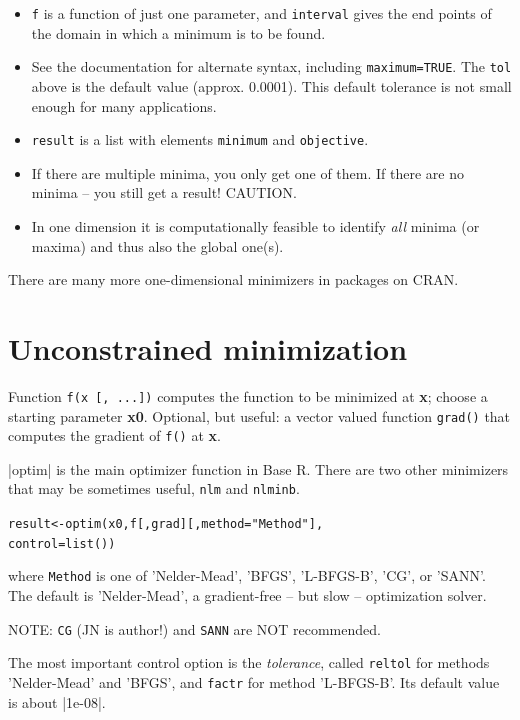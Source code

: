 \documentclass[9pt,a4paper,onecolumn,oneside]{extarticle}
\begin{document}
\begin{landscape}
\begin{multicols}{2}
\begin{itemize}
\item
  \texttt{f} is a function of just one parameter, and \texttt{interval}
  gives the end points of the domain in which a minimum is to be found.
\item
  See the documentation for alternate syntax, including \texttt{maximum=TRUE}.
  The \texttt{tol} above is the default value (approx. 0.0001). This default
  tolerance is not small enough for many applications.
\item
  \texttt{result} is a list with elements \texttt{minimum} and
  \texttt{objective}.
\item
  If there are multiple minima, you only get one of them.
  If there are no minima -- you still get a result! CAUTION.
\item
  In one dimension it is computationally feasible to identify
  \textit{all} minima (or maxima) and thus also the global one(s).
\end{itemize}

There are many more one-dimensional minimizers in packages on CRAN.


\section*{\color{darkred} Unconstrained minimization}

Function \texttt{f(x [, ...])} computes the function to be minimized at 
\textbf{x}; choose a starting parameter \textbf{x0}. Optional, but
useful: a vector valued function \texttt{grad()} that computes the gradient
of \texttt{f()} at \textbf{x}.

|optim| is the main optimizer function in Base R. There are two other
minimizers that may be sometimes useful, \verb|nlm| and \verb|nlminb|.

\begin{alltt}
 result <- optim(x0, f [, grad] [, method = "Method"],
                 control = list())
\end{alltt}
where \texttt{Method} is one of 'Nelder-Mead', 'BFGS', 'L-BFGS-B', 'CG', or 'SANN'.
The default is 'Nelder-Mead', a gradient-free -- but slow -- optimization solver.

NOTE: \texttt{CG} (JN is author!) and \texttt{SANN} are NOT recommended.

The most important control option is the \textit{tolerance}, called 
\texttt{reltol} for methods 'Nelder-Mead' and 'BFGS', and \texttt{factr} 
for method 'L-BFGS-B'. Its default value is about |1e-08|.


\end{multicols}
\end{landscape}
\end{document}
